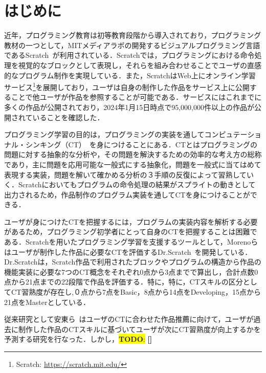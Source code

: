 \documentclass[11pt,dvipdfmx]{jreport}
\newcommand{\todo}[1]{\colorbox{yellow}{{\bf TODO}:}{\color{red} {\textbf{[#1]}}}}
\begin{document}

\chapter{はじめに}
近年，プログラミング教育は初等教育段階から導入されており，プログラミング教材の一つとして，MITメディアラボの開発するビジュアルプログラミング言語であるScratch~\cite{Resnick_2009}が利用されている．Scratchでは，プログラミングにおける命令処理を視覚的なブロックとして表現し，それらを組み合わせることでユーザの直感的なプログラム制作を実現している．また，ScratchはWeb上にオンライン学習サービス\footnote{Scratch: \url{https://scratch.mit.edu/}}を展開しており，ユーザは自身の制作した作品をサービス上に公開することで他ユーザが作品を参照することが可能である．サービスにはこれまでに多くの作品が公開されており，2024年1月15日時点で95,000,000件以上の作品が公開されていることを確認した．

プログラミング学習の目的は，プログラミングの実装を通してコンピュテーショナル・シンキング（CT）~\cite{Wing_2006}を身につけることにある．CTとはプログラミングの問題に対する抽象的な分析や，その問題を解決するための効率的な考え方の総称であり，主に問題を応用可能な一般式にする抽象化，問題を一般式に当てはめて表現する実装，問題を解いて確かめる分析の３手順の反復によって習熟していく．Scratchにおいてもプログラムの命令処理の結果がスプライトの動きとして出力されるため，作品制作のプログラム実装を通してCTを身につけることができる．

ユーザが身につけたCTを把握するには，プログラムの実装内容を解析する必要があるため，プログラミング初学者にとって自身のCTを把握することは困難である．Scratchを用いたプログラミング学習を支援するツールとして，Morenoらはユーザが制作した作品に必要なCTを評価するDr.Scratch~\cite{Moreno_2015}を開発している．Dr.Scratchは，Scratch作品で利用されたブロックやプログラムの構造から作品の機能実装に必要な7つのCT概念をそれぞれ0点から3点までで算出し，合計点数0点から21点までの22段階で作品を評価する．特に，特に，CTスキルの区分としてCT習熟度が存在し,０点から7点をBasic，8点から14点をDeveloping，15点から21点をMasterとしている．

従来研究として安東ら~\cite{Ando_2021}はユーザのCTに合わせた作品推薦に向けて，ユーザが過去に制作した作品のCTスキルに基づいてユーザが次にCT習熟度が向上するかを予測する研究を行なった．しかし，\todo{}




\end{document}
